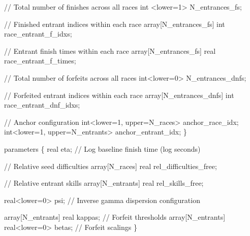 \documentclass[
  letterpaper,
  DIV=11,
  numbers=noendperiod]{scrartcl}
\newenvironment{Shaded}{\begin{snugshade}}{\end{snugshade}}
\newcommand{\CommentTok}[1]{\textcolor[rgb]{0.37,0.37,0.37}{#1}}
\newcommand{\DataTypeTok}[1]{\textcolor[rgb]{0.68,0.00,0.00}{#1}}
\newcommand{\DecValTok}[1]{\textcolor[rgb]{0.68,0.00,0.00}{#1}}
\newcommand{\KeywordTok}[1]{\textcolor[rgb]{0.00,0.23,0.31}{#1}}
\newcommand{\NormalTok}[1]{\textcolor[rgb]{0.00,0.23,0.31}{#1}}
\begin{document}
\begin{codelisting}
\begin{Shaded}
\begin{Highlighting}[]
  \CommentTok{// Total number of finishes across all races}
  \DataTypeTok{int}\NormalTok{ \textless{}}\KeywordTok{lower}\NormalTok{=}\DecValTok{1}\NormalTok{\textgreater{} N\_entrances\_fs;}

  \CommentTok{// Finished entrant indices within each race}
  \DataTypeTok{array}\NormalTok{[N\_entrances\_fs] }\DataTypeTok{int}\NormalTok{ race\_entrant\_f\_idxs;}

  \CommentTok{// Entrant finish times within each race}
  \DataTypeTok{array}\NormalTok{[N\_entrances\_fs] }\DataTypeTok{real}\NormalTok{ race\_entrant\_f\_times;}

  \CommentTok{// Total number of forfeits across all races}
  \DataTypeTok{int}\NormalTok{\textless{}}\KeywordTok{lower}\NormalTok{=}\DecValTok{0}\NormalTok{\textgreater{} N\_entrances\_dnfs;}

  \CommentTok{// Forfeited entrant indices within each race}
  \DataTypeTok{array}\NormalTok{[N\_entrances\_dnfs] }\DataTypeTok{int}\NormalTok{ race\_entrant\_dnf\_idxs;}

  \CommentTok{// Anchor configuration}
  \DataTypeTok{int}\NormalTok{\textless{}}\KeywordTok{lower}\NormalTok{=}\DecValTok{1}\NormalTok{, }\KeywordTok{upper}\NormalTok{=N\_races\textgreater{} anchor\_race\_idx;}
  \DataTypeTok{int}\NormalTok{\textless{}}\KeywordTok{lower}\NormalTok{=}\DecValTok{1}\NormalTok{, }\KeywordTok{upper}\NormalTok{=N\_entrants\textgreater{} anchor\_entrant\_idx;}
\NormalTok{\}}

\KeywordTok{parameters}\NormalTok{ \{}
  \DataTypeTok{real}\NormalTok{ eta; }\CommentTok{// Log baseline finish time (log seconds)}

  \CommentTok{// Relative seed difficulties}
  \DataTypeTok{array}\NormalTok{[N\_races] }\DataTypeTok{real}\NormalTok{ rel\_difficulties\_free;}

  \CommentTok{// Relative entrant skills}
  \DataTypeTok{array}\NormalTok{[N\_entrants] }\DataTypeTok{real}\NormalTok{ rel\_skills\_free;}

  \DataTypeTok{real}\NormalTok{\textless{}}\KeywordTok{lower}\NormalTok{=}\DecValTok{0}\NormalTok{\textgreater{} psi; }\CommentTok{// Inverse gamma dispersion configuration}

  \DataTypeTok{array}\NormalTok{[N\_entrants] }\DataTypeTok{real}\NormalTok{ kappas;         }\CommentTok{// Forfeit thresholds}
  \DataTypeTok{array}\NormalTok{[N\_entrants] }\DataTypeTok{real}\NormalTok{\textless{}}\KeywordTok{lower}\NormalTok{=}\DecValTok{0}\NormalTok{\textgreater{} betas; }\CommentTok{// Forfeit scalings}
\NormalTok{\}}


\end{Highlighting}
\end{Shaded}
\end{codelisting}
\end{document}
